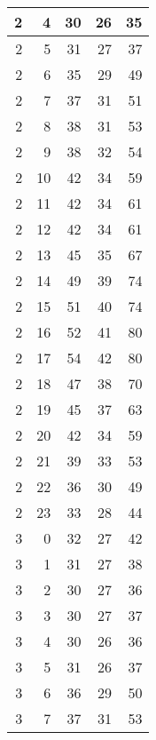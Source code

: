 \begin{longtable}{|r|r|r|r|r|}
    \hline
    2     & 4     & 30    & 26    & 35 \\
    \hline
    2     & 5     & 31    & 27    & 37 \\
    \hline
    2     & 6     & 35    & 29    & 49 \\
    \hline
    2     & 7     & 37    & 31    & 51 \\
    \hline
    2     & 8     & 38    & 31    & 53 \\
    \hline
    2     & 9     & 38    & 32    & 54 \\
    \hline
    2     & 10    & 42    & 34    & 59 \\
    \hline
    2     & 11    & 42    & 34    & 61 \\
    \hline
    2     & 12    & 42    & 34    & 61 \\
    \hline
    2     & 13    & 45    & 35    & 67 \\
    \hline
    2     & 14    & 49    & 39    & 74 \\
    \hline
    2     & 15    & 51    & 40    & 74 \\
    \hline
    2     & 16    & 52    & 41    & 80 \\
    \hline
    2     & 17    & 54    & 42    & 80 \\
    \hline
    2     & 18    & 47    & 38    & 70 \\
    \hline
    2     & 19    & 45    & 37    & 63 \\
    \hline
    2     & 20    & 42    & 34    & 59 \\
    \hline
    2     & 21    & 39    & 33    & 53 \\
    \hline
    2     & 22    & 36    & 30    & 49 \\
    \hline
    2     & 23    & 33    & 28    & 44 \\
    \hline
    3     & 0     & 32    & 27    & 42 \\
    \hline
    3     & 1     & 31    & 27    & 38 \\
    \hline
    3     & 2     & 30    & 27    & 36 \\
    \hline
    3     & 3     & 30    & 27    & 37 \\
    \hline
    3     & 4     & 30    & 26    & 36 \\
    \hline
    3     & 5     & 31    & 26    & 37 \\
    \hline
    3     & 6     & 36    & 29    & 50 \\
    \hline
    3     & 7     & 37    & 31    & 53 \\

\end{longtable}
